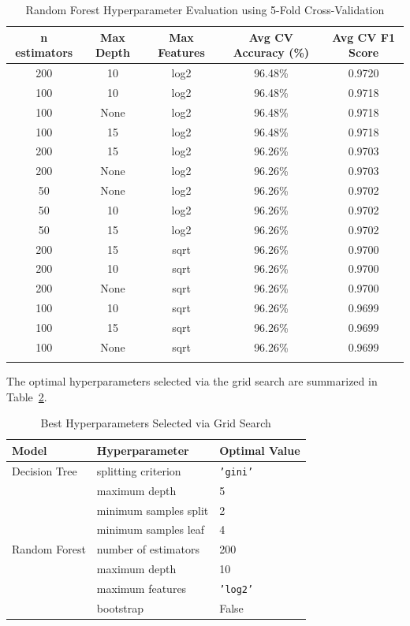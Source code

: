 \documentclass[12pt,a4paper]{article}
\begin{document}
\begin{longtable}{|c|c|c|c|c|}
\hline
\textbf{n estimators} & \textbf{Max Depth} & \textbf{Max Features} & \textbf{Avg CV Accuracy (\%)} & \textbf{Avg CV F1 Score} \\ \hline
\endhead
200 & 10 & log2 & 96.48\% & 0.9720 \\ \hline
100 & 10 & log2 & 96.48\% & 0.9718 \\ \hline
100 & None & log2 & 96.48\% & 0.9718 \\ \hline
100 & 15 & log2 & 96.48\% & 0.9718 \\ \hline
200 & 15 & log2 & 96.26\% & 0.9703 \\ \hline
200 & None & log2 & 96.26\% & 0.9703 \\ \hline
50 & None & log2 & 96.26\% & 0.9702 \\ \hline
50 & 10 & log2 & 96.26\% & 0.9702 \\ \hline
50 & 15 & log2 & 96.26\% & 0.9702 \\ \hline
200 & 15 & sqrt & 96.26\% & 0.9700 \\ \hline
200 & 10 & sqrt & 96.26\% & 0.9700 \\ \hline
200 & None & sqrt & 96.26\% & 0.9700 \\ \hline
100 & 10 & sqrt & 96.26\% & 0.9699 \\ \hline
100 & 15 & sqrt & 96.26\% & 0.9699 \\ \hline
100 & None & sqrt & 96.26\% & 0.9699 \\ \hline
\caption{Random Forest Hyperparameter Evaluation using 5-Fold Cross-Validation}
\label{tab:rf_tuning}
\end{longtable}

The optimal hyperparameters selected via the grid search are summarized in Table~\ref{tab:best_params}.

\begin{table}[H]
\centering
\caption{Best Hyperparameters Selected via Grid Search}
\label{tab:best_params}
\vspace{0.2cm}
\begin{tabular}{lll}
\toprule
\textbf{Model} & \textbf{Hyperparameter} & \textbf{Optimal Value} \\
\midrule
Decision Tree & splitting criterion & \texttt{'gini'} \\
              & maximum depth & 5 \\
              & minimum samples split & 2 \\
              & minimum samples leaf & 4 \\
\midrule
Random Forest & number of estimators & 200 \\
              & maximum depth & 10 \\
              & maximum features & \texttt{'log2'} \\
              & bootstrap & False \\
\bottomrule
\end{tabular}
\end{table}
\end{document}
